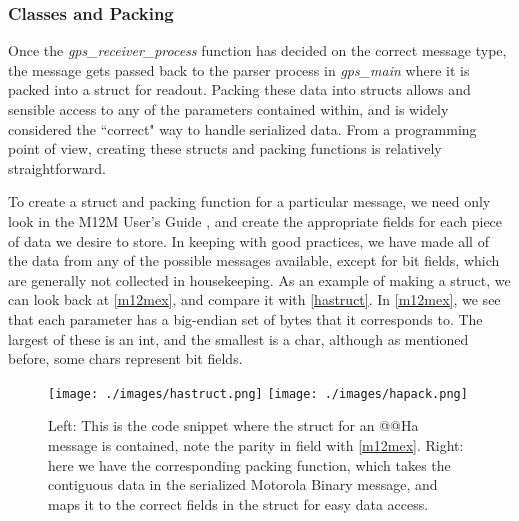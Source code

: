 \subsubsection{Classes and Packing}
Once the \textit{gps\_receiver\_process} function has decided on the correct message type, the message gets passed back to the parser process in \textit{gps\_main} where it is packed into a struct for readout. Packing these data into structs allows and sensible access to any of the parameters contained within, and is widely considered the ``correct" way to handle serialized data. From a programming point of view, creating these structs and packing functions is relatively straightforward. 

To create a struct and packing function for a particular message, we need only look in the M12M User's Guide \cite{m12muser}, and create the appropriate fields for each piece of data we desire to store. In keeping with good practices, we have made all of the data from any of the possible messages available, except for bit fields, which are generally not collected in housekeeping. As an example of making a struct, we can look back at \autoref{m12mex}, and compare it with \autoref{hastruct}. In \autoref{m12mex}, we see that each parameter has a big-endian set of bytes that it corresponds to. The largest of these is an int, and the smallest is a char, although as mentioned before, some chars represent bit fields. 

\begin{figure}[h!]
\centering
\texttt{[image: ./images/hastruct.png]}
\texttt{[image: ./images/hapack.png]}
\caption[@@Ha Message Struct and Packing Function]{Left: This is the code snippet where the struct for an @@Ha message is contained, note the parity in field with \autoref{m12mex}. Right: here we have the corresponding packing function, which takes the contiguous data in the serialized Motorola Binary message, and maps it to the correct fields in the struct for easy data access.}
\label{hastruct}
\end{figure}


